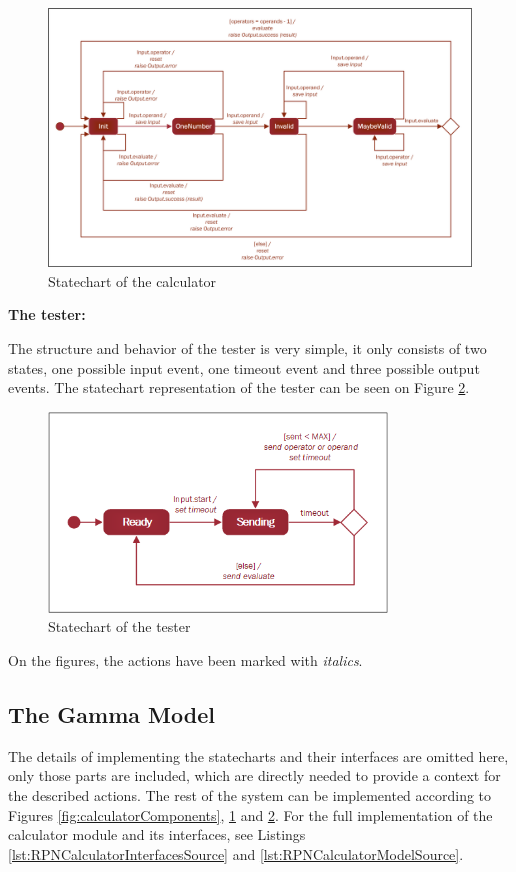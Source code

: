 \begin{figure}[!h]
	\centering
	\includegraphics[width=150mm, keepaspectratio]{figures/calculatorStatechart.png}
	\caption{Statechart of the calculator}
	\label{fig:calculatorStatechart}
\end{figure}

\bigskip
\textbf{The tester:}

The structure and behavior of the tester is very simple, it only consists of two states, one possible input event, one timeout event and three possible output events. The statechart representation of the tester can be seen on Figure \ref{fig:testerStatechart}.

\begin{figure}[!h]
	\centering
	\includegraphics[width=90mm, keepaspectratio]{figures/testerStatechart.png}
	\caption{Statechart of the tester}
	\label{fig:testerStatechart}
\end{figure}

On the figures, the actions have been marked with \textit{italics}. 

\subsection{The Gamma Model}
The details of implementing the statecharts and their interfaces are omitted here, only those parts are included, which are directly needed to provide a context for the described actions. The rest of the system can be implemented according to Figures \ref{fig:calculatorComponents}, \ref{fig:calculatorStatechart} and \ref{fig:testerStatechart}. For the full implementation of the calculator module and its interfaces, see Listings \ref{lst:RPNCalculatorInterfacesSource} and \ref{lst:RPNCalculatorModelSource}.

